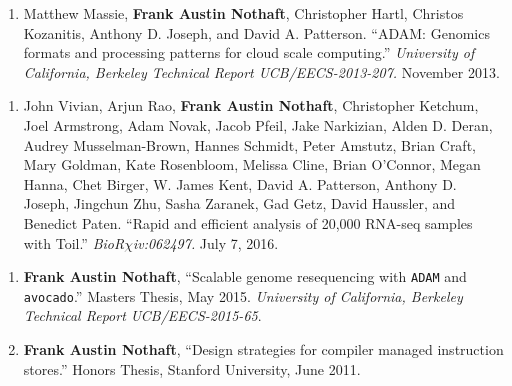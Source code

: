 \documentclass[10pt]{article} %
\newcounter{pubCtr}
\begin{document}
\begin {minipage}[t]{0.2\linewidth}
\vspace{0pt}
\end {minipage}
\begin {minipage}[t]{0.8\linewidth}
\vspace{0pt}


\begin{enumerate}
\setcounter{enumi}{\thepubCtr}
\item {Matthew Massie, \textbf{Frank Austin Nothaft}, Christopher Hartl, Christos Kozanitis,
Anthony D. Joseph, and David A. Patterson. ``ADAM: Genomics formats and processing patterns
for cloud scale computing.'' \emph{University of California, Berkeley Technical Report
UCB/EECS-2013-207.} November 2013.}
\setcounter{pubCtr}{\theenumi}
\end{enumerate}


\begin{enumerate}
\setcounter{enumi}{\thepubCtr}
\item {John Vivian, Arjun Rao, \textbf{Frank Austin Nothaft}, Christopher Ketchum,
Joel Armstrong, Adam Novak, Jacob Pfeil, Jake Narkizian, Alden D. Deran,
Audrey Musselman-Brown, Hannes Schmidt, Peter Amstutz, Brian Craft, Mary Goldman,
Kate Rosenbloom, Melissa Cline, Brian O'Connor, Megan Hanna, Chet Birger,
W. James Kent, David A. Patterson, Anthony D. Joseph, Jingchun Zhu,
Sasha Zaranek, Gad Getz, David Haussler, and Benedict Paten. ``Rapid and efficient
analysis of 20,000 RNA-seq samples with Toil.'' \emph{BioR$\chi$iv:062497.}}
July 7, 2016.
\setcounter{pubCtr}{\theenumi}
\end{enumerate}


\begin{enumerate}
\setcounter{enumi}{\thepubCtr}
\item {\textbf{Frank Austin Nothaft}, ``Scalable genome resequencing with \texttt{ADAM} and \texttt{avocado}.''
Masters Thesis, May 2015. \emph{University of California, Berkeley Technical Report UCB/EECS-2015-65}.} 
\item {\textbf{Frank Austin Nothaft}, ``Design strategies for compiler managed instruction stores.''
Honors Thesis, Stanford University, June 2011.}
\end{enumerate}

\noindent{}

\end {minipage}
\end{document}
